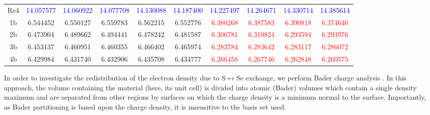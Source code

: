 \documentclass[superscriptaddress, amsmath,amssymb, preprint]{revtex4-2}
\begin{document}
\begin{center}
\begin{table}[b]
{\begin{tabular}{|c|c|c|c|c|c|c|c|c|c|}
Re4 & \textcolor{blue}{14.057577} & \textcolor{blue}{14.060922} & \textcolor{blue}{14.077708} & \textcolor{blue}{14.130088} & \textcolor{blue}{14.187400} & \textcolor{blue}{14.227497} & \textcolor{blue}{14.264671} & \textcolor{blue}{14.330714} & \textcolor{blue}{14.385614} \\
1b & 6.544452 & 6.550127 & 6.559783 & 6.562215 & 6.552776 & \textcolor{red}{6.380268} & \textcolor{red}{6.387583} & \textcolor{red}{6.390818} & \textcolor{red}{6.374640} \\
2b & 6.473904 & 6.489662 & 6.494441 & 6.478242 & 6.481587 & \textcolor{red}{6.306781} & \textcolor{red}{6.310824} & \textcolor{red}{6.293594} & \textcolor{red}{6.293976} \\
3b & 6.453137 & 6.460951 & 6.460355 & 6.466402 & 6.465974 & \textcolor{red}{6.283784} & \textcolor{red}{6.283642} & \textcolor{red}{6.283117} & \textcolor{red}{6.286072} \\
4b & 6.429984 & 6.431740 & 6.432906 & 6.435708 & 6.434777 & \textcolor{red}{6.266458} & \textcolor{red}{6.267746} & \textcolor{red}{6.262848} & \textcolor{red}{6.260575} \\
\hline
\end{tabular}}
\end{table}
\end{center}

In order to investigate the redistribution of the electron density due to S$\leftrightarrow$Se exchange, we perform Bader charge analysis \cite{bader_charge, henkelman_cms_2006}. In this approach, the volume containing the material (here, its unit cell) is divided into atomic (Bader) volumes which contain a single density maximum and are separated from other regions by surfaces on which the charge density is a minimum normal to the surface. Importantly, as Bader partitioning is based upon the charge density, it is insensitive to the basis set used.
\end{document}
